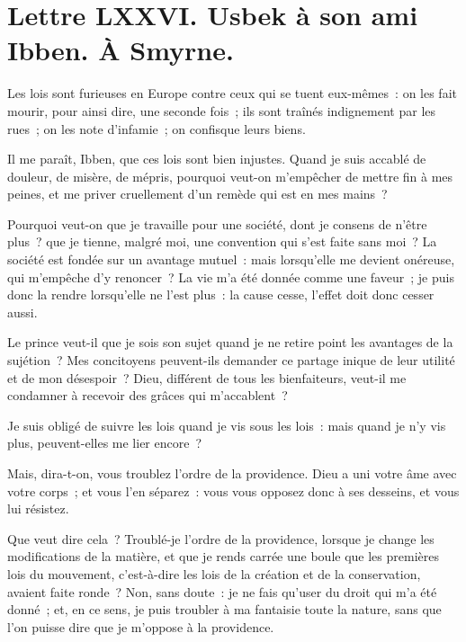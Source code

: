 \documentclass[french,twoside]{book} %
\newcommand{\dateline}[1]{\medskip{\RaggedLeft{#1}\par}\bigskip}
\begin{document}
\dateline{De Paris, le 13 de la lune de Saphar, 1715.}
\section[{Lettre LXXVI. Usbek à son ami Ibben. À Smyrne.}]{Lettre LXXVI. Usbek à son ami Ibben. À Smyrne.}\renewcommand{\leftmark}{Lettre LXXVI. Usbek à son ami Ibben. À Smyrne.}

\noindent Les lois sont furieuses en Europe contre ceux qui se tuent eux-mêmes : on les fait mourir, pour ainsi dire, une seconde fois ; ils sont traînés indignement par les rues ; on les note d’infamie ; on confisque leurs biens.\par
Il me paraît, Ibben, que ces lois sont bien injustes. Quand je suis accablé de douleur, de misère, de mépris, pourquoi veut-on m’empêcher de mettre fin à mes peines, et me priver cruellement d’un remède qui est en mes mains ?\par
Pourquoi veut-on que je travaille pour une société, dont je consens de n’être plus ? que je tienne, malgré moi, une convention qui s’est faite sans moi ? La société est fondée sur un avantage mutuel : mais lorsqu’elle me devient onéreuse, qui m’empêche d’y renoncer ? La vie m’a été donnée comme une faveur ; je puis donc la rendre lorsqu’elle ne l’est plus : la cause cesse, l’effet doit donc cesser aussi.\par
Le prince veut-il que je sois son sujet quand je ne retire point les avantages de la sujétion ? Mes concitoyens peuvent-ils demander ce partage inique de leur utilité et de mon désespoir ? Dieu, différent de tous les bienfaiteurs, veut-il me condamner à recevoir des grâces qui m’accablent ?\par
Je suis obligé de suivre les lois quand je vis sous les lois : mais quand je n’y vis plus, peuvent-elles me lier encore ?\par
Mais, dira-t-on, vous troublez l’ordre de la providence. Dieu a uni votre âme avec votre corps ; et vous l’en séparez : vous vous opposez donc à ses desseins, et vous lui résistez.\par
Que veut dire cela ? Troublé-je l’ordre de la providence, lorsque je change les modifications de la matière, et que je rends carrée une boule que les premières lois du mouvement, c’est-à-dire les lois de la création et de la conservation, avaient faite ronde ? Non, sans doute : je ne fais qu’user du droit qui m’a été donné ; et, en ce sens, je puis troubler à ma fantaisie toute la nature, sans que l’on puisse dire que je m’oppose à la providence.\par
\end{document}
